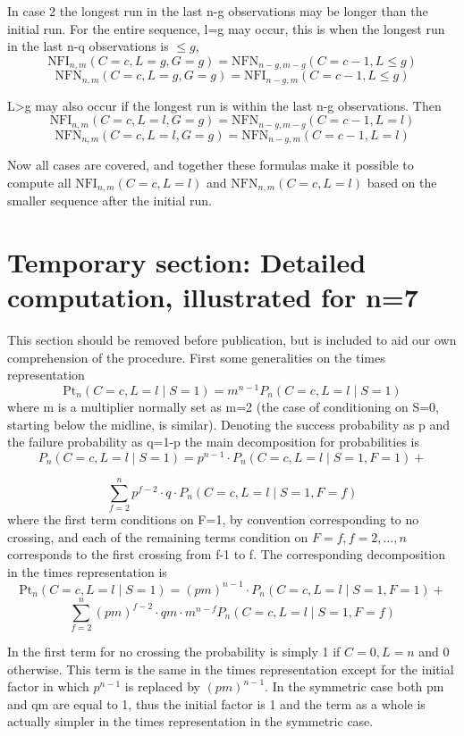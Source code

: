 In case 2 the longest run in the last n-g observations may be longer than the initial run. For the entire sequence, l=g may occur, this is when the longest run in the last n-q observations is $\leq g$,
$$\text{NFI}_{n,m} (C=c, L=g, G=g) = \text{NFN}_{n-g,m-g} (C=c-1, L \leq g)$$
$$\text{NFN}_{n,m} (C=c, L=g, G=g) = \text{NFI}_{n-g,m} (C=c-1, L \leq g)$$

L>g may also occur if the longest run is within the last n-g observations. Then
$$\text{NFI}_{n,m} (C=c, L=l, G=g) = \text{NFN}_{n-g,m-g} (C=c-1, L=l)$$
$$\text{NFN}_{n,m} (C=c, L=l, G=g) = \text{NFN}_{n-g,m} (C=c-1, L=l)$$

Now all cases are covered, and together these formulas make it possible to compute all $\text{NFI}_{n,m} (C=c, L=l)$ and $\text{NFN}_{n,m} (C=c, L=l)$ based on the smaller sequence after the initial run.

\section{Temporary section: Detailed computation, illustrated for n=7}

This section should be removed before publication, but is included to aid our own comprehension of the procedure. First some generalities on the times representation $$\text{Pt}_n ( C=c, L=l \mid S=1 ) = m^{n-1} P_n ( C=c, L=l \mid S=1 )$$ where m is a multiplier normally set as m=2 (the case of conditioning on S=0, starting below the midline, is similar). Denoting the success probability as p and the failure probability as q=1-p the main decomposition for probabilities is $$P_n ( C=c, L=l \mid S=1) = p^{n-1} \cdot P_n ( C=c, L=l \mid S=1, F=1) +$$

$$ \sum_{f=2}^n p^{f-2} \cdot  q \cdot P_n ( C=c, L=l \mid S=1, F=f)$$
where the first term conditions on F=1, by convention corresponding to no crossing, and each of the remaining terms condition on $F=f, f =2, \ldots , n$ corresponds to the first crossing from f-1 to f. The corresponding decomposition in the times representation is $$\text{Pt}_n ( C=c, L=l \mid S=1) = (pm)^{n-1} \cdot P_n ( C=c, L=l \mid S=1, F=1) +$$
$$ \sum_{f=2}^n (pm)^{f-2} \cdot  qm \cdot m^{n-f} P_n ( C=c, L=l \mid S=1, F=f)$$

In the first term for no crossing the probability is simply 1 if $C=0, L=n$ and 0 otherwise. This term is the same in the times representation except for the initial factor in which $p^{n-1}$ is replaced by $(pm)^{n-1}$. In the symmetric case both pm and qm are equal to 1, thus the initial factor is 1 and the term as a whole is actually simpler in the times representation in the symmetric case.

